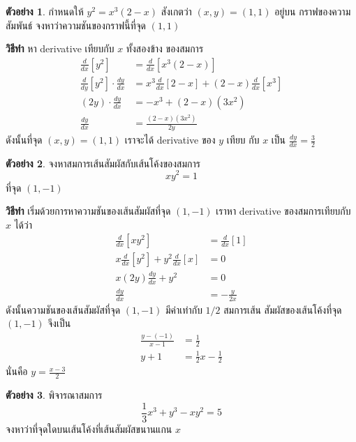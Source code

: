 \documentclass[
]{book}
\theoremstyle{definition}
\theoremstyle{definition}
\newtheorem{example}{ตัวอย่าง}[chapter]
\theoremstyle{definition}
\theoremstyle{definition}
\theoremstyle{remark}
\begin{document}
\begin{example}
กำหนดให้ \(y^2 = x^3(2-x)\) สังเกตว่า \((x,y) = (1,1)\) อยู่บน กราฟของความสัมพันธ์
จงหาว่าความชันของกราฟนี้ที่จุด \((1,1)\)
\end{example}

\textbf{วิธีทำ} หา derivative เทียบกับ \(x\) ทั้งสองข้าง ของสมการ
\begin{equation}   \begin{aligned}
    \frac{d}{dx}[y^2] &= \frac{d}{dx}[x^3(2-x)] \\
    \frac{d}{dy}[y^2] \cdot \frac{dy}{dx} &= x^3\frac{d}{dx}[2-x] + (2-x)\frac{d}{dx}[x^3] \\
    (2y) \cdot \frac{dy}{dx} &= -x^3 + (2-x)(3x^2) \\
    \frac{dy}{dx} &= \frac{(2-x)(3x^2)}{2y}
  \end{aligned} \end{equation} ดังนั้นที่จุด \((x,y) = (1,1)\) เราจะได้
derivative ของ \(y\) เทียบ กับ \(x\) เป็น
\(\displaystyle \frac{dy}{dx} = \frac{3}{2}\)

\begin{example}
จงหาสมการเส้นสัมผัสกับเส้นโค้งของสมการ \[xy^2 = 1\] ที่จุด \((1,-1)\)
\end{example}

\textbf{วิธีทำ} เริ่มด้วยการหาความชันของเส้นสัมผัสที่จุด \((1,-1)\) เราหา derivative
ของสมการเทียบกับ \(x\) ได้ว่า \begin{equation}   \begin{aligned}
    \frac{d}{dx}[xy^2] &= \frac{d}{dx}[1] \\
    x\frac{d}{dx}[y^2] + y^2\frac{d}{dx}[x] &= 0 \\
    x(2y)\frac{dy}{dx} + y^2 &= 0 \\
    \frac{dy}{dx} &= -\frac{y}{2x}
  \end{aligned} \end{equation} ดังนั้นความชันของเส้นสัมผัสที่จุด \((1,-1)\) มีค่าเท่ากับ
\(1/2\) สมการเส้น สัมผัสของเส้นโค้งที่จุด \((1,-1)\) จึงเป็น
\begin{equation}   \begin{aligned}
    \frac{y-(-1)}{x-1} &= \frac{1}{2} \\
    y+1 &= \frac{1}{2}x -\frac{1}{2}
  \end{aligned} \end{equation} นั่นคือ \(\displaystyle y=\frac{x-3}{2}\)

\begin{example}
พิจารณาสมการ \[\frac{1}{3}x^3+y^3-xy^2 = 5\]
จงหาว่าที่จุดใดบนเส้นโค้งที่เส้นสัมผัสขนานแกน \(x\)
\end{example}
\end{document}
